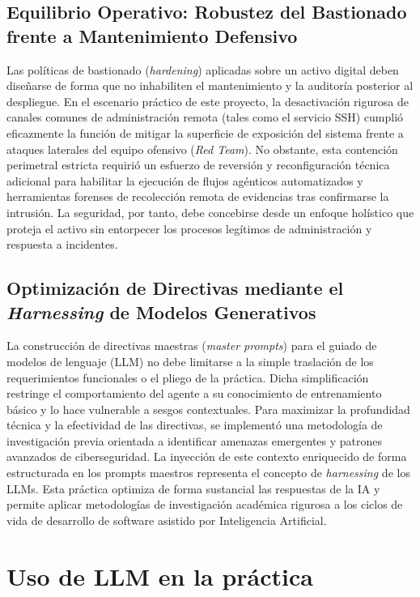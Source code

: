 \subsection*{Equilibrio Operativo: Robustez del Bastionado frente a Mantenimiento Defensivo}
Las políticas de bastionado (\textit{hardening}) aplicadas sobre un activo digital deben diseñarse de forma que no inhabiliten el mantenimiento y la auditoría posterior al despliegue. En el escenario práctico de este proyecto, la desactivación rigurosa de canales comunes de administración remota (tales como el servicio SSH) cumplió eficazmente la función de mitigar la superficie de exposición del sistema frente a ataques laterales del equipo ofensivo (\textit{Red Team}). No obstante, esta contención perimetral estricta requirió un esfuerzo de reversión y reconfiguración técnica adicional para habilitar la ejecución de flujos agénticos automatizados y herramientas forenses de recolección remota de evidencias tras confirmarse la intrusión. La seguridad, por tanto, debe concebirse desde un enfoque holístico que proteja el activo sin entorpecer los procesos legítimos de administración y respuesta a incidentes.


\subsection*{Optimización de Directivas mediante el \textit{Harnessing} de Modelos Generativos}
La construcción de directivas maestras (\textit{master prompts}) para el guiado de modelos de lenguaje (LLM) no debe limitarse a la simple traslación de los requerimientos funcionales o el pliego de la práctica. Dicha simplificación restringe el comportamiento del agente a su conocimiento de entrenamiento básico y lo hace vulnerable a sesgos contextuales. Para maximizar la profundidad técnica y la efectividad de las directivas, se implementó una metodología de investigación previa orientada a identificar amenazas emergentes y patrones avanzados de ciberseguridad. La inyección de este contexto enriquecido de forma estructurada en los prompts maestros representa el concepto de \textit{harnessing} de los LLMs. Esta práctica optimiza de forma sustancial las respuestas de la IA y permite aplicar metodologías de investigación académica rigurosa a los ciclos de vida de desarrollo de software asistido por Inteligencia Artificial.

\section[Uso de LLM en la Práctica]{Uso de LLM en la práctica}
\label{sec:uso_llm_practica}


